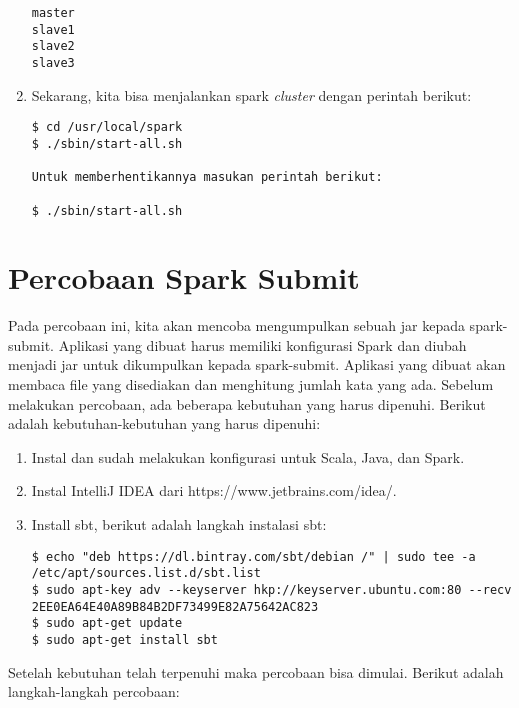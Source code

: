 \begin{enumerate}
\begin{verbatim}
master
slave1
slave2
slave3
\end{verbatim}

\item Sekarang, kita bisa menjalankan spark \textit{cluster} dengan perintah berikut:

\begin{verbatim}
$ cd /usr/local/spark
$ ./sbin/start-all.sh

Untuk memberhentikannya masukan perintah berikut:

$ ./sbin/start-all.sh
\end{verbatim}


\end{enumerate}

\section{Percobaan Spark Submit}

Pada percobaan ini, kita akan mencoba mengumpulkan sebuah jar kepada spark-submit. Aplikasi yang dibuat harus memiliki konfigurasi Spark dan diubah menjadi jar untuk dikumpulkan kepada spark-submit. Aplikasi yang dibuat akan membaca file yang disediakan dan menghitung jumlah kata yang ada. Sebelum melakukan percobaan, ada beberapa kebutuhan yang harus dipenuhi. Berikut adalah kebutuhan-kebutuhan yang harus dipenuhi:

\begin{enumerate}

\item Instal dan sudah melakukan konfigurasi untuk Scala, Java, dan Spark.

\item Instal IntelliJ IDEA dari https://www.jetbrains.com/idea/.

\item Install sbt, berikut adalah langkah instalasi sbt:

\begin{verbatim}
$ echo "deb https://dl.bintray.com/sbt/debian /" | sudo tee -a /etc/apt/sources.list.d/sbt.list
$ sudo apt-key adv --keyserver hkp://keyserver.ubuntu.com:80 --recv 2EE0EA64E40A89B84B2DF73499E82A75642AC823
$ sudo apt-get update
$ sudo apt-get install sbt
\end{verbatim}


\end{enumerate}

Setelah kebutuhan telah terpenuhi maka percobaan bisa dimulai. Berikut adalah langkah-langkah percobaan:

